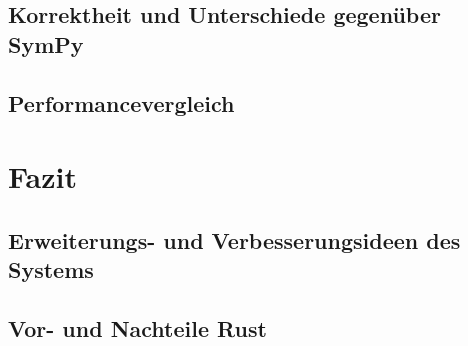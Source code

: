 \documentclass[11pt,a4paper, ngerman]{article}
\begin{document}
\subsection{Korrektheit und Unterschiede gegenüber SymPy}
\subsection{Performancevergleich}

\newpage

\section{Fazit}
\subsection{Erweiterungs- und Verbesserungsideen des Systems}
\subsection{Vor- und Nachteile Rust}


\newpage

\raggedright

\end{document}

